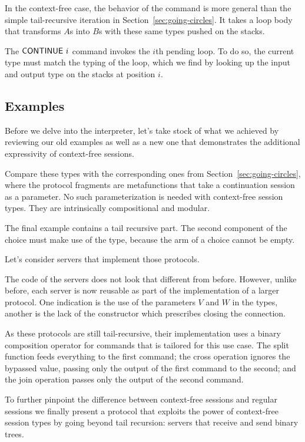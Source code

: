 \documentclass[acmsmall,screen]{acmart}
\begin{document}
In the context-free case, the behavior of the {\AMU} command is more
general than the simple tail-recursive iteration in
Section~\ref{sec:going-circles}. It takes a loop body that transforms
$A$s into $B$s with these same types pushed on the stacks.

The {$\ACONTINUE~i$} command invokes the $i$th pending loop. To do so,
the current type must match the typing of the loop, which we find by
looking up the input and output type on the stacks at position $i$.

\subsection{Examples}
\label{sec:examples}



Before we delve into the interpreter, let's take stock of what we
achieved by reviewing our old examples as well as a new one that
demonstrates the additional expressivity of context-free sessions.
\cstBinaryp

Compare these types with the corresponding ones from
Section~\ref{sec:going-circles}, where the protocol fragments are
metafunctions that take a continuation session as a parameter. No such
parameterization is needed with context-free session types. They are
intrinsically compositional and modular.

The final example {\Amanyunaryp} contains a tail recursive part. The
second component of the choice must make use of the {\Atcfskip} type,
because the arm of a choice cannot be empty.

Let's consider servers that implement those protocols.
\cstCmdExamples

The code of the servers does not look that different from
before. However, unlike before, each server is now reusable as part of
the implementation of a larger protocol. One indication is the use of
the parameters $V$ and $W$ in the types, another is the lack of the
{\ACCLOSE} constructor which prescribes closing the connection.

As these protocols are still tail-recursive, their implementation uses
a binary composition operator for commands that is tailored for this
use case. The split function feeds everything to the first command; the
cross operation ignores the bypassed value, passing only the output of
the first command to the second; and the join operation passes only
the output of the second command.
\cstTailComposition


To further pinpoint the difference between context-free sessions and
regular sessions we finally present a protocol that
exploits the power of context-free session types by going beyond tail
recursion: servers that receive and send binary trees. 
\cstTreep
\end{document}
